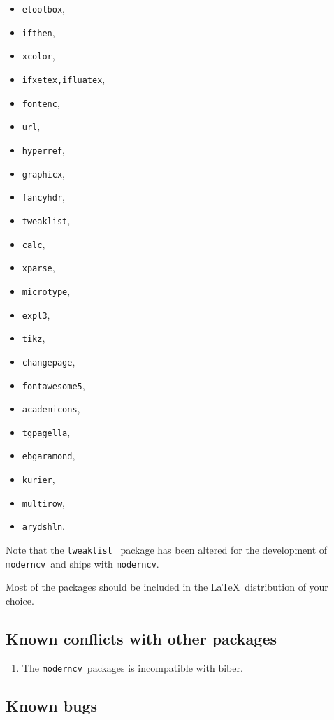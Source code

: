 \documentclass[a4paper,11pt]{article}
\newcommand{\code}[1]{\lstinline!#1!}
\newcommand{\Code}[1]{\lstinline!#1!~} %
\newcommand{\moderncv}{\code{moderncv}}
\newcommand{\Moderncv}{\Code{moderncv}}
\begin{document}
\begin{itemize}
  \item\code{etoolbox}, 
  \item\code{ifthen}, 
  \item\code{xcolor}, 
  \item\code{ifxetex,ifluatex}, 
  \item\code{fontenc}, 
  \item\code{url}, 
  \item\code{hyperref}, 
  \item\code{graphicx}, 
  \item\code{fancyhdr}, 
  \item\code{tweaklist}, 
  \item\code{calc}, 
  \item\code{xparse}, 
  \item\code{microtype}, 
  \item\code{expl3}, 
  \item\code{tikz}, 
  \item\code{changepage}, 
  \item\code{fontawesome5}, 
  \item\code{academicons}, 
  \item\code{tgpagella}, %
  \item\code{ebgaramond}, %
  \item\code{kurier}, 
  \item\code{multirow},
  \item\code{arydshln}. %
\end{itemize}

Note that the \Code{tweaklist} package has been altered for the development of \Moderncv and ships 
with \moderncv.

Most of the packages should be included in the \LaTeX\ distribution of your choice.

\subsection{Known conflicts with other packages}
\begin{enumerate}
  \item The \Moderncv packages is incompatible with biber.
\end{enumerate}

\subsection{Known bugs}

\end{document}
